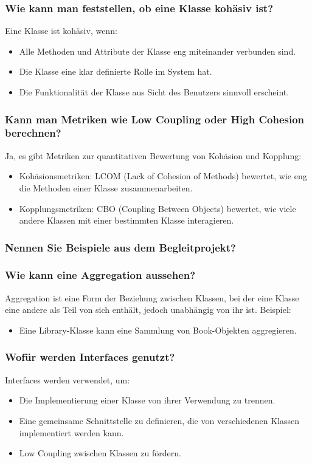 \documentclass[main.tex]{subfiles}
\begin{document}
\subsubsection*{Wie kann man feststellen, ob eine Klasse kohäsiv ist?}
Eine Klasse ist kohäsiv, wenn:
\begin{itemize}
    \item Alle Methoden und Attribute der Klasse eng miteinander verbunden sind.
    \item Die Klasse eine klar definierte Rolle im System hat.
    \item Die Funktionalität der Klasse aus Sicht des Benutzers sinnvoll erscheint.
\end{itemize}

\subsubsection*{Kann man Metriken wie  \gls{Low Coupling} oder \gls{High Cohesion} berechnen?}
Ja, es gibt Metriken zur quantitativen Bewertung von \gls{Kohäsion} und \gls{Kopplung}:
\begin{itemize}
    \item Kohäsionsmetriken: LCOM (Lack of Cohesion of Methods) bewertet, wie eng die Methoden einer Klasse zusammenarbeiten.
    \item Kopplungsmetriken: CBO (Coupling Between Objects) bewertet, wie viele andere Klassen mit einer bestimmten Klasse interagieren.
\end{itemize}


\subsubsection*{Nennen Sie Beispiele aus dem Begleitprojekt?} %

\subsubsection*{Wie kann eine \gls{Aggregation} aussehen?}
\gls{Aggregation} ist eine Form der Beziehung zwischen Klassen, bei der eine Klasse eine andere als Teil von sich enthält, jedoch unabhängig von ihr ist. Beispiel:
\begin{itemize}
    \item Eine Library-Klasse kann eine Sammlung von Book-Objekten aggregieren.
\end{itemize}


\subsubsection*{Wofür werden \glspl{Interface} genutzt?}
\glspl{Interface} werden verwendet, um:
\begin{itemize}
    \item Die Implementierung einer Klasse von ihrer Verwendung zu trennen.
    \item Eine gemeinsame Schnittstelle zu definieren, die von verschiedenen Klassen implementiert werden kann.
    \item \gls{Low Coupling} zwischen Klassen zu fördern.
\end{itemize}
\end{document}
